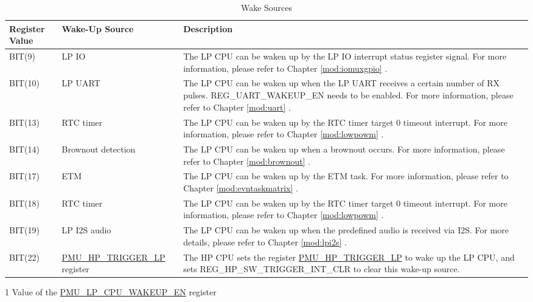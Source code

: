 \documentclass[main\_\_EN.tex]{subfiles}
\begin{document}
    \begin{table}[H]
    \centering
    \caption{Wake Sources}
    \label{tab:ulp-wake-sources}
    \begin{threeparttable}
    \begin{tabular}{| l | l | m{9cm}|}
    \hline
    \rowcolor{lightgray}
    Register Value \tnote{1} & Wake-Up Source & Description  \\\hline

    BIT(9)  & LP IO & The LP CPU can be waken up by the LP IO interrupt status register signal. For more information, please refer to Chapter \ref{mod:iomuxgpio} \textit{\nameref{mod:iomuxgpio}}. \\\hline
    BIT(10)  & LP UART & The LP CPU can be waken up when the LP UART receives a certain number of RX pulses. REG\_UART\_WAKEUP\_EN needs to be enabled. For more information, please refer to Chapter \ref{mod:uart} \textit{\nameref{mod:uart}}. \\\hline
    BIT(13) & RTC timer & The LP CPU can be waken up by the RTC timer target 0 timeout interrupt. For more information, please refer to Chapter \ref{mod:lowpowm} \textit{\nameref{mod:lowpowm}}. \\\hline
    BIT(14) & Brownout detection & The LP CPU can be waken up when a brownout occurs. For more information, please refer to Chapter \ref{mod:brownout} \textit{\nameref{mod:brownout}}. \\\hline
    BIT(17)  & ETM &  The LP CPU can be waken up by the ETM task. For more information, please refer to Chapter \ref{mod:evntaskmatrix} \textit{\nameref{mod:evntaskmatrix}}. \\\hline
    BIT(18) & RTC timer & The LP CPU can be waken up by the RTC timer target 0 timeout interrupt. For more information, please refer to Chapter \ref{mod:lowpowm} \textit{\nameref{mod:lowpowm}}. \\\hline
    BIT(19) & LP I2S audio & The LP CPU can be waken up when the predefined audio is received via I2S. For more details, please refer to Chapter \ref{mod:lpi2s} \textit{\nameref{mod:lpi2s}}.\\\hline
    BIT(22)  & \hyperref[fielddesc:PMUHPTRIGGERLP]{PMU\_HP\_TRIGGER\_LP} register & The HP CPU sets the register \hyperref[fielddesc:PMUHPTRIGGERLP]{PMU\_HP\_TRIGGER\_LP} to wake up the LP CPU, and sets REG\_HP\_SW\_TRIGGER\_INT\_CLR to clear this wake-up source.\\\hline
\end{tabular}
    \begin{tablenotes}
        \item[1] Value of the \hyperref[fielddesc:PMULPCPUWAKEUPEN]{PMU\_LP\_CPU\_WAKEUP\_EN} register
    \end{tablenotes}
    \end{threeparttable}
\end{table}
\end{document}
